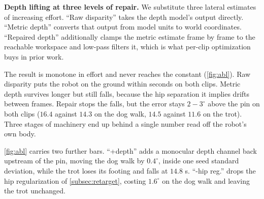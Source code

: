 \documentclass[letterpaper, 10 pt, conference]{ieeeconf}
\newcommand{\aref}[1]{~\hyperref[#1]{App.~\ref*{#1}}}
\newcommand{\aref}[1]{}
\begin{document}
\textbf{Depth lifting at three levels of repair.}
We substitute three lateral estimates of increasing effort. ``Raw disparity'' takes the depth model's output directly. ``Metric depth'' converts that output from model units to world coordinates. ``Repaired depth'' additionally clamps the metric estimate frame by frame to the reachable workspace and low-pass filters it, which is what per-clip optimization buys in prior work.

The result is monotone in effort and never reaches the constant (\autoref{fig:abl}). Raw disparity puts the robot on the ground within seconds on both clips. Metric depth survives longer but still falls, because the hip separation it implies drifts between frames. Repair stops the falls, but the error stays $2-3^\circ$ above the pin on both clips ($16.4$ against $14.3$ on the dog walk, $14.5$ against $11.6$ on the trot). Three stages of machinery end up behind a single number read off the robot's own body.

\autoref{fig:abl} carries two further bars. ``+depth'' adds a monocular depth channel back upstream of the pin, moving the dog walk by $0.4^\circ$, inside one seed standard deviation, while the trot loses its footing and falls at $14.8$ s. ``-hip reg.'' drops the hip regularization of \autoref{subsec:retarget}, costing $1.6^\circ$ on the dog walk and leaving the trot unchanged.

\end{document}
